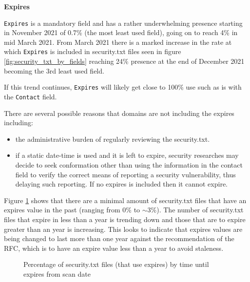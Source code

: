 \documentclass{mscreport}
\begin{document}
\vspace{0.7cm} \noindent
\textbf{Expires}

\noindent
\texttt{Expires} is a mandatory field and has a rather underwhelming presence starting in November 2021 of 0.7\% (the most least used field), going on to reach 4\% in mid March 2021. From March 2021 there is a marked increase in the rate at which \texttt{Expires} is included in security.txt files seen in figure \ref{fig:security_txt_by_fields} reaching 24\% presence at the end of December 2021 becoming the 3rd least used field.

\vspace{0.3cm} \noindent
If this trend continues, \texttt{Expires} will likely get close to 100\% use such as is with the \texttt{Contact} field.

\vspace{0.3cm} \noindent
There are several possible reasons that domains are not including the expires including:
\begin{itemize}
	\setlength\itemsep{0.01em}
    \item the administrative burden of regularly reviewing the security.txt.
    \item if a static date-time is used and it is left to expire, security researches may decide to seek conformation other than using the information in the contact field to verify the correct means of reporting a security vulnerability, thus delaying such reporting. If no expires is included then it cannot expire.
\end{itemize}


\noindent
Figure \ref{fig:security_txt_by_when_expires} shows that there are a minimal amount of security.txt files that have an expires value in the past (ranging from 0\% to $\sim$3\%). The number of security.txt files that expire in less than a year is trending down and those that are to expire greater than an year is increasing. This looks to indicate that expires values are being changed to last more than one year against the recommendation of the RFC, which is to have an expire value less than a year to avoid staleness.


\begin{figure}[t]
	\begin{center}
		\caption{Percentage of security.txt files (that use expires) by time until expires from scan date}
		\label{fig:security_txt_by_when_expires}
	\end{center}
\end{figure}
\end{document}
